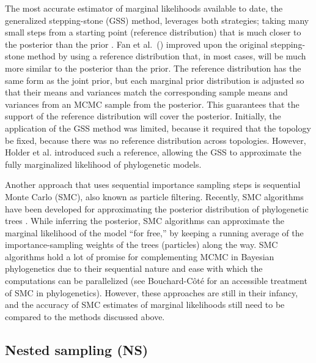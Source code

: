 The most accurate estimator of marginal likelihoods available to date, the
generalized stepping-stone (GSS) method, leverages both strategies; taking many
small steps from a starting point (reference distribution) that is much closer
to the posterior than the prior \citep{Fan2011}.
Fan et al.\ (\citeyear{Fan2011}) improved upon the original stepping-stone
method by using a reference distribution that, in most cases, will be much more
similar to the posterior than the prior.
The reference distribution has the same form as the joint prior,
but each marginal prior
distribution is adjusted so that their means and variances match the
corresponding sample means and variances from an MCMC sample from the
posterior.
This guarantees that the support of the reference distribution will cover the
posterior.
Initially, the application of the GSS method was limited, because it required
that the topology be fixed, because there was no reference distribution across
topologies.
However, Holder et al. \citeyear{Holder2014} introduced such a reference,
allowing the GSS to approximate the fully marginalized likelihood of
phylogenetic models.

Another approach that uses sequential importance sampling steps is sequential
Monte Carlo (SMC), also known as particle filtering.
Recently, SMC algorithms have been developed for approximating the posterior
distribution of phylogenetic trees \citep{Jordan2012,Bouchard2014}.
While inferring the posterior, SMC algorithms can approximate the marginal
likelihood of the model ``for free,'' by keeping a running average of the
importance-sampling weights of the trees (particles) along the way.
SMC algorithms hold a lot of promise for complementing MCMC in Bayesian
phylogenetics due to their sequential nature and ease with which the
computations can be parallelized (see Bouchard-C\^{o}t\'{e}
\citeyear{Bouchard2014} for an accessible treatment of SMC in phylogenetics).
However, these approaches are still in their infancy, and the accuracy of SMC
estimates of marginal likelihoods still need to be compared to the methods
discussed above.


\subsection{Nested sampling (NS)}

